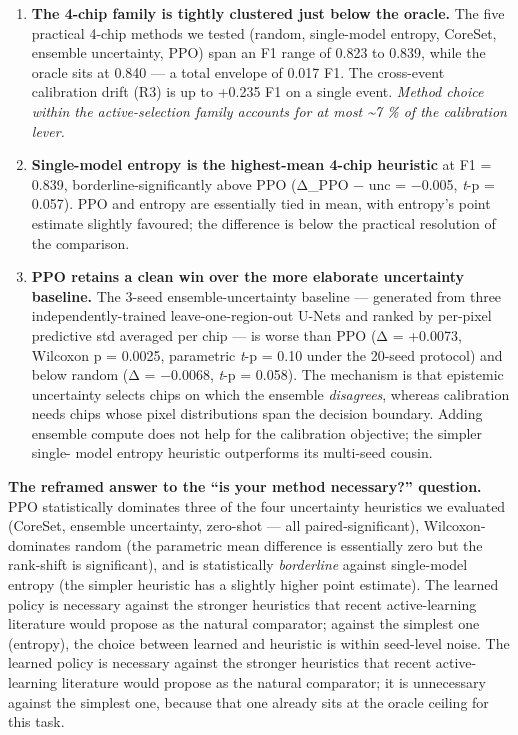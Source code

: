 \begin{enumerate}
\def\labelenumi{\arabic{enumi}.}
\tightlist
\item
  \textbf{The 4-chip family is tightly clustered just below the oracle.}
  The five practical 4-chip methods we tested (random, single-model
  entropy, CoreSet, ensemble uncertainty, PPO) span an F1 range of
  0.823 to 0.839, while the oracle sits at 0.840 --- a total envelope
  of 0.017 F1. The cross-event calibration drift (R3) is up to +0.235
  F1 on a single event. \emph{Method choice within the active-selection
  family accounts for at most \textasciitilde7 \% of the calibration lever.}
\item
  \textbf{Single-model entropy is the highest-mean 4-chip heuristic} at
  F1 = 0.839, borderline-significantly above PPO (Δ\_PPO − unc = −0.005,
  \emph{t}-p = 0.057). PPO and entropy are essentially tied in mean, with
  entropy's point estimate slightly favoured; the difference is below
  the practical resolution of the comparison.
\item
  \textbf{PPO retains a clean win over the more elaborate uncertainty
  baseline.} The 3-seed ensemble-uncertainty baseline --- generated
  from three independently-trained leave-one-region-out U-Nets and
  ranked by per-pixel predictive std averaged per chip --- is
  worse than PPO (Δ = +0.0073, Wilcoxon p = 0.0025, parametric
  \emph{t}-p = 0.10 under the 20-seed protocol) and below random
  (Δ = −0.0068, \emph{t}-p = 0.058). The
  mechanism is that epistemic uncertainty selects chips on which the
  ensemble \emph{disagrees}, whereas calibration needs chips whose pixel
  distributions span the decision boundary. Adding ensemble compute
  does not help for the calibration objective; the simpler single-
  model entropy heuristic outperforms its multi-seed cousin.
\end{enumerate}

\textbf{The reframed answer to the ``is your method necessary?'' question.}
PPO statistically dominates three of the four uncertainty heuristics we
evaluated (CoreSet, ensemble uncertainty, zero-shot --- all
paired-significant), Wilcoxon-dominates random (the parametric mean
difference is essentially zero but the rank-shift is significant), and
is statistically \emph{borderline} against single-model entropy (the simpler
heuristic has a slightly higher point estimate). The learned policy is
necessary against the stronger heuristics that recent active-learning
literature would propose as the natural comparator; against the simplest
one (entropy), the choice between learned and heuristic is within
seed-level noise.
The learned policy is necessary against the stronger heuristics that
recent active-learning literature would propose as the natural
comparator; it is unnecessary against the simplest one, because that one
already sits at the oracle ceiling for this task.

